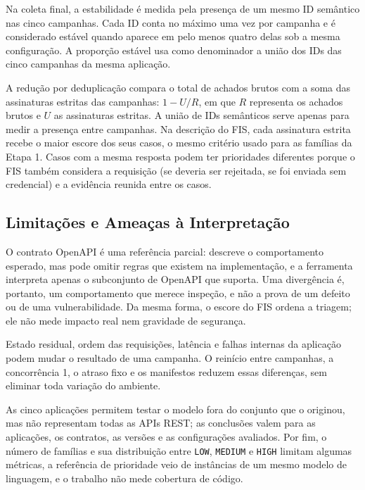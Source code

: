 Na coleta final, a estabilidade é medida pela presença de um mesmo ID semântico
nas cinco campanhas. Cada ID
conta no máximo uma vez por campanha e é considerado estável quando aparece em
pelo menos quatro delas sob a mesma configuração. A proporção estável usa como
denominador a união dos IDs das cinco campanhas da mesma aplicação.

A redução por deduplicação compara o total de achados brutos com a soma das
assinaturas estritas das campanhas: $1 - U/R$, em que $R$ representa os achados
brutos e $U$ as assinaturas estritas. A união de IDs semânticos serve apenas
para medir a presença entre campanhas.
Na descrição do FIS, cada assinatura estrita recebe o maior escore dos seus
casos, o mesmo critério usado para as famílias da Etapa 1. Casos com a mesma
resposta podem ter prioridades diferentes porque o FIS também considera a
requisição (se deveria ser rejeitada, se foi enviada sem credencial) e a
evidência reunida entre os casos.

\subsection{Limitações e Ameaças à Interpretação}

O contrato OpenAPI é uma referência parcial: descreve o comportamento
esperado, mas pode omitir regras que existem na implementação, e a ferramenta
interpreta apenas o subconjunto de OpenAPI que suporta. Uma divergência é,
portanto, um comportamento que merece inspeção, e não a prova de um defeito ou
de uma vulnerabilidade. Da mesma forma, o escore do FIS ordena a triagem; ele
não mede impacto real nem gravidade de segurança.

Estado residual, ordem das requisições, latência e falhas internas da
aplicação podem mudar o resultado de uma campanha. O reinício entre campanhas,
a concorrência 1, o atraso fixo e os manifestos reduzem essas diferenças, sem
eliminar toda variação do ambiente.

As cinco aplicações permitem testar o modelo fora do conjunto que o originou,
mas não representam todas as APIs REST; as conclusões valem para as
aplicações, os contratos, as versões e as configurações avaliados. Por fim, o
número de famílias e sua distribuição entre \texttt{LOW}, \texttt{MEDIUM} e
\texttt{HIGH} limitam algumas métricas, a referência de prioridade veio de
instâncias de um mesmo modelo de linguagem, e o trabalho não mede cobertura de
código.
